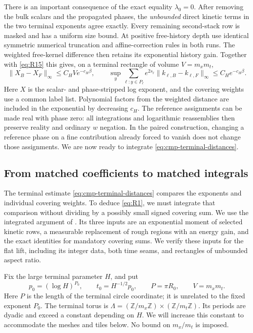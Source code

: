 There is an important consequence of the exact equality $\lambda_0=0$.
After removing the bulk scalars and the propagated phases, the
\emph{unbounded} direct kinetic terms in the two terminal exponents
agree exactly.  Every remaining second-stack row is masked and has a
uniform size bound.  At positive free-history depth use identical
symmetric numerical truncation and affine-correction rules in both
runs.  The weighted free-kernel difference then retains its exponential
history gain.  Together with \eqref{eq:R15} this gives, on a terminal
rectangle of volume $V=m_xm_t$,
\begin{equation}
 \|X_B-X_F\|_\infty\le C_HV e^{-c_H\beta},
 \qquad
 \sup_y\sum_{\ell:y\in P_\ell}
 e^{2s_\ell}\|k_{\ell,B}-k_{\ell,F}\|_\infty
 \le C_He^{-c_H\beta}.
 \label{eq:cmp-terminal-distances}
\end{equation}
Here $X$ is the scalar- and phase-stripped log exponent, and the
covering weights use a common label list.  Polynomial factors from
the weighted distance are included in the exponential by decreasing
$c_H$.  The reference assignments can be made real with phase zero:
all integrations and logarithmic reassemblies then preserve reality
and ordinary $w$ negation.  In the paired construction, changing a
reference phase on a fine contribution already forced to vanish does
not change those assignments.  We are now ready to integrate
\eqref{eq:cmp-terminal-distances}.

\subsection{From matched coefficients to matched integrals}
\label{subsec:comparison-integration}

The terminal estimate \eqref{eq:cmp-terminal-distances} compares the exponents and individual
covering weights.  To deduce \eqref{eq:R1}, we must integrate that comparison
without dividing by a possibly small signed covering sum.  We use the
integrated argument of \cite[Section~7, ``Integrated comparison of endpoint
densities'']{O3Continuum}.  Its three inputs are an exponential moment of
selected kinetic rows, a measurable replacement of rough regions with an
energy gain, and the exact identities for mandatory covering sums.  We
verify these inputs for the flat lift, including its integer data, both
time seams, and rectangles of unbounded aspect ratio.

Fix the large terminal parameter \(H\), and put
\[
 p_0=(\log H)^{P_0},\qquad t_0=H^{-1/2}p_0,\qquad
 P=\pi R_0,\qquad V=m_xm_t.
\]
Here \(P\) is the length of the terminal circle coordinate; it is unrelated
to the fixed exponent \(P_0\).  The terminal torus is
\(\Lambda=(\mathbb Z/m_x\mathbb Z)\times
(\mathbb Z/m_t\mathbb Z)\).  Its periods are dyadic and exceed a constant
depending on \(H\).  We will increase this constant to accommodate the
meshes and tiles below.  No bound on \(m_x/m_t\) is imposed.


